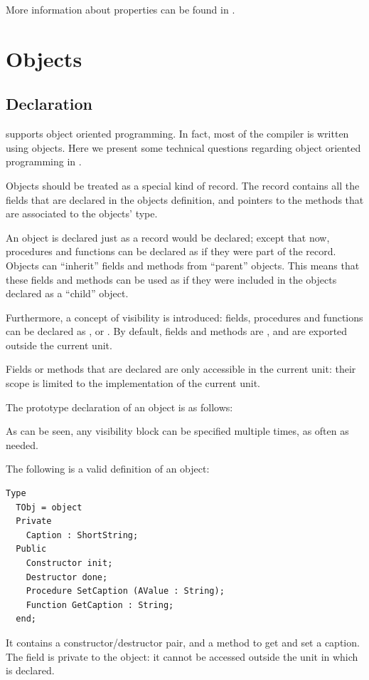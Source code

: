 More information about properties can be found in .

\chapter{Objects}
\label{ch:Objects}

\section{Declaration}
\fpc supports object oriented programming. In fact, most  of the compiler is
written using objects. Here we present some technical questions regarding
object oriented programming in \fpc.

Objects should be treated as a special kind of record. The record contains
all the fields that are declared in the objects definition, and pointers
to the methods that are associated to the objects' type.

An object is declared just as a record would be declared; except that
now, procedures and functions can be declared as if they were part of the record.
Objects can ``inherit'' fields and methods from ``parent'' objects. This means
that these fields and methods can be used as if they were included in the
objects declared as a ``child'' object.

Furthermore, a concept of visibility  is introduced:
fields, procedures and functions can be declared as ,
 or
. By default, fields and methods are , and
are exported outside the current unit.

Fields or methods that are declared  are only accessible
in the current unit: their scope is limited to the implementation of the
current unit.

The prototype declaration of an object is as follows:

As can be seen, any visibility block can be specified multiple times, as
often as needed.

The following is a valid definition of an object:
\begin{verbatim}
Type
  TObj = object
  Private
    Caption : ShortString;
  Public
    Constructor init;
    Destructor done;
    Procedure SetCaption (AValue : String);
    Function GetCaption : String;
  end;
\end{verbatim}
It contains a constructor/destructor pair, and a method to get and set a
caption. The  field is private to the object: it cannot be accessed
outside the unit in which  is declared.

